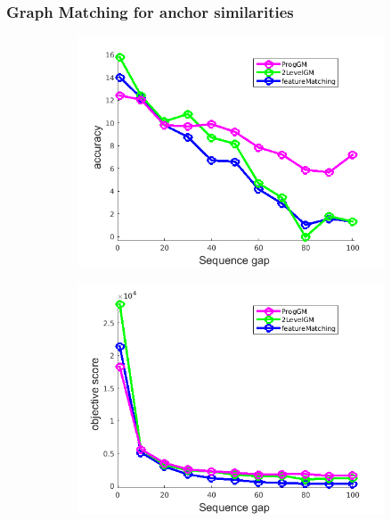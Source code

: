 \documentclass[
	fontsize=12pt,
	paper=a4,
	twoside=false,
	numbers=noenddot,
	plainheadsepline,
	toc=listof,
	toc=bibliography
]{scrartcl}
\begin{document}
\subsubsection{Graph Matching for anchor similarities}
\vspace{-20pt}
\begin{figure}[h] 
	\begin{subfigure}[b]{0.3\textwidth}
		\centering
		\includegraphics[scale=0.25]{"fig_ver2608/RealImages/HouseSeq/no_descr/using_cpd_afftrafo/solution/performance/accuracy"}  
	\end{subfigure}%
	\begin{subfigure}[b]{0.3\textwidth}
		\centering
		\includegraphics[scale=0.25]{"fig_ver2608/RealImages/HouseSeq/no_descr/using_cpd_afftrafo/solution/performance/score"}  

\end{subfigure}
\end{figure}
\end{document}
